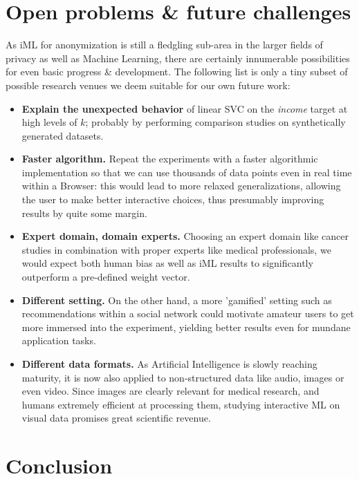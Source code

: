 \documentclass{llncs}
\begin{document}
\section{Open problems \& future challenges}
\label{sect:op_fc}

As iML for anonymization is still a fledgling sub-area in the larger fields of privacy as well as Machine Learning, there are certainly innumerable possibilities for even basic progress \& development. The following list is only a tiny subset of possible research venues we deem suitable for our own future work:

\begin{itemize}
	\item \textbf{Explain the unexpected behavior} of linear SVC on the \textit{income} target at high levels of $k$; probably by performing comparison studies on synthetically generated datasets.
	\item \textbf{Faster algorithm.} Repeat the experiments with a faster algorithmic implementation so that we can use thousands of data points even in real time within a Browser: this would lead to more relaxed generalizations, allowing the user to make better interactive choices, thus presumably improving results by quite some margin.
	\item \textbf{Expert domain, domain experts.} Choosing an expert domain like cancer studies in combination with proper experts like medical professionals, we would expect both human bias as well as iML results to significantly outperform a pre-defined weight vector.
	\item \textbf{Different setting.} On the other hand, a more 'gamified' setting such as recommendations within a social network could motivate amateur users to get more immersed into the experiment, yielding better results even for mundane application tasks.
	\item \textbf{Different data formats.} As Artificial Intelligence is slowly reaching maturity, it is now also applied to non-structured data like audio, images or even video. Since images are clearly relevant for medical research, and humans extremely efficient at processing them, studying interactive ML on visual data promises great scientific revenue. 
\end{itemize}


\section{Conclusion}
\label{sect:conclusion}
\end{document}
